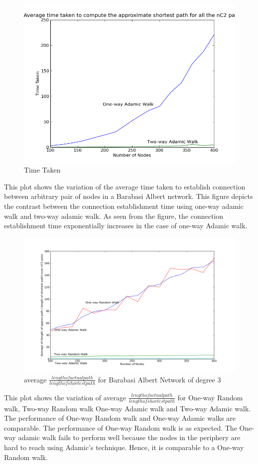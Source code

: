 \documentclass[a4paper,12pt]{article}
\begin{document}
\begin{figure}[htp]
\centering
\includegraphics[scale=0.50]{Results/SFNtime1Adamicand2Adamic.png}
\caption{Time Taken}
\label{SFNtime1Adamicand2Adamic}
\end{figure}
This plot shows the variation of the average time taken to establish connection between arbitrary pair of nodes in a Barabasi Albert network. This figure depicts the contrast between the connection establishment time using one-way adamic walk and two-way adamic walk. As seen from the figure, the connection establishment time exponentially increases in the case of one-way Adamic walk.

\begin{figure}[htp]
\centering
\includegraphics[scale=0.40]{Results/SFNratioall.png}
\caption{average $\frac{length of actual path}{length of shortest path}$ for Barabasi Albert Network of degree 3}
\label{SFNratio-all}
\end{figure}
This plot shows the variation of average $\frac{length of actual path}{length of shortest path}$ for One-way Random walk, Two-way Random walk One-way Adamic walk and Two-way Adamic walk. The performance of One-way Random walk and One-way Adamic walks are comparable. The performance of One-way Random walk is as expected. The One-way adamic walk fails to perform well because the nodes in the periphery are hard to reach using Adamic's technique. Hence, it is comparable to a One-way Random walk.
\end{document}
